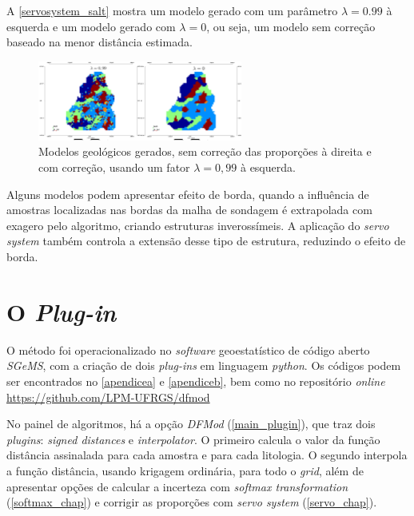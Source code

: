 A \autoref{servosystem_salt} mostra um modelo gerado com um parâmetro $\lambda=0.99$ à esquerda e um modelo gerado com $\lambda=0$, ou seja, um modelo sem correção baseado na menor distância estimada.

\begin{figure}[!ht]
	\caption{\label{servosystem_salt}Modelos geológicos gerados, sem correção das proporções à direita e com correção, usando um fator $\lambda = 0,99$ à esquerda.}
	\begin{center}
		\includegraphics[width=0.6\textwidth]{modelagem_geologica/servosystem}
	\end{center}
\end{figure}

Alguns modelos podem apresentar efeito de borda, quando a influência de amostras localizadas nas bordas da malha de sondagem é extrapolada com exagero pelo algoritmo, criando estruturas inverossímeis. A aplicação do \textit{servo system} também controla a extensão desse tipo de estrutura, reduzindo o efeito de borda.

\section{O \textit{Plug-in}}

O método foi operacionalizado no \textit{software} geoestatístico de código aberto \textit{SGeMS}, com a criação de dois \textit{plug-ins} em linguagem \textit{python}. Os códigos podem ser encontrados no \autoref{apendicea} e \autoref{apendiceb}, bem como no repositório \textit{online} \url{https://github.com/LPM-UFRGS/dfmod}

No painel de algoritmos, há a opção \textit{DFMod} (\autoref{main_plugin}), que traz dois \textit{plugins}: \textit{signed distances} e \textit{interpolator}. O primeiro calcula o valor da função distância assinalada para cada amostra e para cada litologia. O segundo interpola a função distância, usando krigagem ordinária, para todo o \textit{grid}, além de apresentar opções de calcular a incerteza com \textit{softmax transformation} (\autoref{softmax_chap}) e corrigir as proporções com \textit{servo system} (\autoref{servo_chap}).

